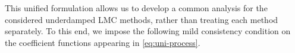 \documentclass[12pt]{article}
\numberwithin{equation}{section}
\begin{document}
%
This unified formulation allows us to develop a common analysis for the considered underdamped LMC methods, rather than treating each method separately. 
%
To this end, we impose the following mild consistency condition on the coefficient functions appearing in \eqref{eq:uni-process}. 
%
\end{document}
